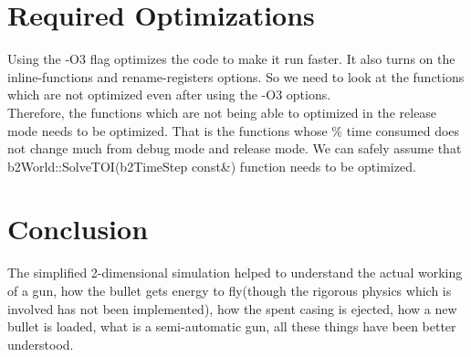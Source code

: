\documentclass [11pt]{report}
\begin{document}
\section{Required Optimizations}
Using the -O3 flag optimizes the code to make it run faster. It also turns on the inline-functions and rename-registers options. So we need to look at the functions which are not optimized even after using the -O3 options.\\

Therefore, the functions which are not being able to optimized in the release mode needs to be optimized. That is the functions whose \% time consumed does not change much from debug mode and release mode. We can safely assume that b2World::SolveTOI(b2TimeStep const\&) function needs to be optimized.

\section{Conclusion}
The simplified 2-dimensional simulation helped to understand the actual working of a gun, how the bullet gets energy to fly(though the rigorous physics which is  involved has not been implemented), how the spent casing is ejected, how a new bullet is loaded, what is a semi-automatic gun, all these things have been better understood. 

\end{document}
